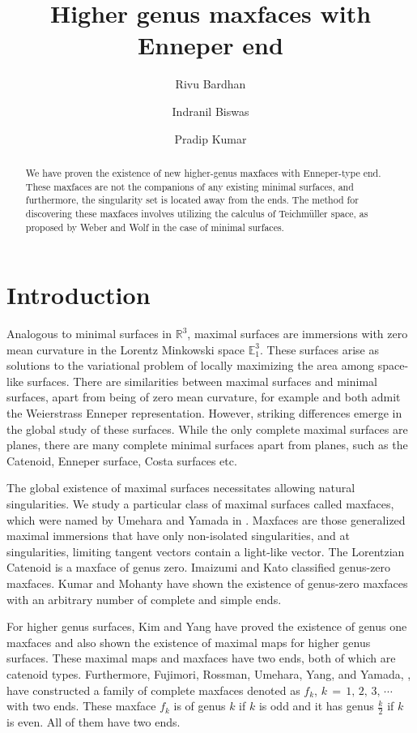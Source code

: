 \documentclass[12pt,epsfig,tikz,multi]{amsart}
\title{Higher genus maxfaces with Enneper end}
\author[R. Bardhan]{Rivu Bardhan}
\author[I. Biswas]{Indranil Biswas}
\author[P. Kumar]{Pradip Kumar}
\numberwithin{equation}{section}
\begin{document}

\maketitle
\begin{abstract}
We have proven the existence of new higher-genus maxfaces with Enneper-type end. These maxfaces are not the companions of any existing minimal surfaces, and furthermore, the singularity set is located away from the ends. The method for discovering these maxfaces involves utilizing the calculus of Teichm\"uller space, as proposed by Weber and Wolf in the case of minimal surfaces.
\end{abstract}

\section{\textbf{Introduction}}

Analogous to minimal surfaces in $\mathbb{R}^3$, maximal surfaces are immersions with zero mean curvature in 
the Lorentz Minkowski space $\mathbb E_1^3$. These surfaces arise as solutions to the variational problem of 
locally maximizing the area among space-like surfaces.
There are similarities between maximal surfaces and minimal surfaces, apart from being of zero mean curvature,
for example and both admit the Weierstrass Enneper representation.
However, striking differences emerge in the global study of these surfaces.  While the only complete maximal surfaces are planes, 
there are many complete minimal surfaces apart from planes, such as the Catenoid, Enneper surface, Costa surfaces etc.

The global existence of maximal surfaces necessitates allowing natural singularities. We study
a particular class of maximal surfaces called maxfaces, which were named by Umehara and Yamada in \cite{UMEHARA2006}. Maxfaces
are those generalized maximal immersions that have only non-isolated singularities, and at singularities, limiting tangent vectors 
contain a light-like vector.
The Lorentzian Catenoid is a maxface of genus zero. Imaizumi and Kato \cite{imaizumi2008} classified genus-zero maxfaces. Kumar and 
Mohanty \cite{Saipradip2023} have shown the existence of genus-zero maxfaces with an arbitrary number of complete and simple ends.

For higher genus surfaces, Kim and Yang \cite{Kim2006} have proved the existence of genus one maxfaces and also shown the existence of 
maximal maps for higher genus surfaces. These maximal maps and maxfaces have two ends, both of which are catenoid types.
Furthermore, Fujimori, Rossman, Umehara, Yang, and Yamada, \cite{Fujimori2009}, have constructed a family of complete maxfaces denoted as 
$f_k$, $k \,=\, 1,\, 2,\, 3,\,\cdots$ with two ends. These maxface $f_k$ is of genus $k$ if $k$ is odd and
it has genus $\frac{k}{2}$ if $k$ is even. All of them have two ends.
\end{document}
